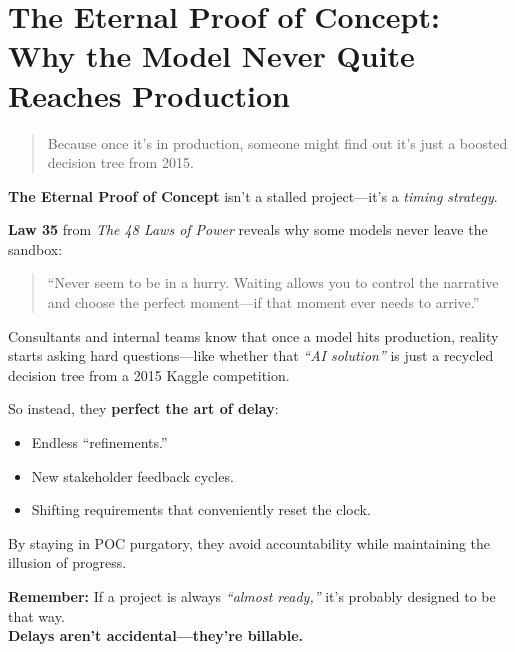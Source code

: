 \section{The Eternal Proof of Concept: Why the Model Never Quite Reaches Production}

\begin{quote}
Because once it’s in production, someone might find out it’s just a boosted decision tree from 2015.
\end{quote}

  \textbf{The Eternal Proof of Concept} isn’t a stalled project—it’s a \textit{timing strategy}.
  
  \medskip
  
  \textbf{Law 35} from \textit{The 48 Laws of Power} reveals why some models never leave the sandbox:
  \begin{quote}
  ``Never seem to be in a hurry. Waiting allows you to control the narrative and choose the perfect moment—if that moment ever needs to arrive.''
  \end{quote}
  
  \medskip
  
  Consultants and internal teams know that once a model hits production, reality starts asking hard questions—like whether that \textit{``AI solution''} is just a recycled decision tree from a 2015 Kaggle competition.
  
  \medskip
  
  So instead, they \textbf{perfect the art of delay}:
  \begin{itemize}
    \item Endless ``refinements.''
    \item New stakeholder feedback cycles.
    \item Shifting requirements that conveniently reset the clock.
  \end{itemize}
  
  \medskip
  
  By staying in POC purgatory, they avoid accountability while maintaining the illusion of progress.
  
  \medskip
  
  \textbf{Remember:} If a project is always \textit{``almost ready,''} it’s probably designed to be that way. \\
  \textbf{Delays aren’t accidental—they’re billable.}
  





